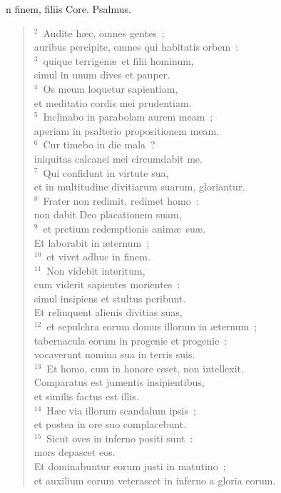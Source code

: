 \bchapter
{}n finem, filiis Core. Psalmus.
\begin{flushleft}\begin{verse}\vspace{6pt}${}^{2}$~Audite h\ae c, omnes gentes~;\\ auribus percipite, omnes qui habitatis orbem~:\\
${}^{3}$~quique terrigen\ae\ et filii hominum,\\ simul in unum dives et pauper.\\
${}^{4}$~Os meum loquetur sapientiam,\\ et meditatio cordis mei prudentiam.\\
${}^{5}$~Inclinabo in parabolam aurem meam~;\\ aperiam in psalterio propositionem meam.\\
${}^{6}$~Cur timebo in die mala~?\\ iniquitas calcanei mei circumdabit me.\\
${}^{7}$~Qui confidunt in virtute sua,\\ et in multitudine divitiarum suarum, gloriantur.\\
${}^{8}$~Frater non redimit, redimet homo~:\\ non dabit Deo placationem suam,\\
${}^{9}$~et pretium redemptionis anim\ae\ su\ae .\\ Et laborabit in \ae ternum~;\\
${}^{10}$~et vivet adhuc in finem.\\
${}^{11}$~Non videbit interitum,\\ cum viderit sapientes morientes~:\\ simul insipiens et stultus peribunt.\\ Et relinquent alienis divitias suas,\\
${}^{12}$~et sepulchra eorum domus illorum in \ae ternum~;\\ tabernacula eorum in progenie et progenie~:\\ vocaverunt nomina sua in terris suis.\\
${}^{13}$~Et homo, cum in honore esset, non intellexit.\\ Comparatus est jumentis insipientibus,\\ et similis factus est illis.\\
${}^{14}$~H\ae c via illorum scandalum ipsis~;\\ et postea in ore suo complacebunt.\\
${}^{15}$~Sicut oves in inferno positi sunt~:\\ mors depascet eos.\\ Et dominabuntur eorum justi in matutino~;\\ et auxilium eorum veterascet in inferno a gloria eorum.\\

\end{verse}
\end{flushleft}
